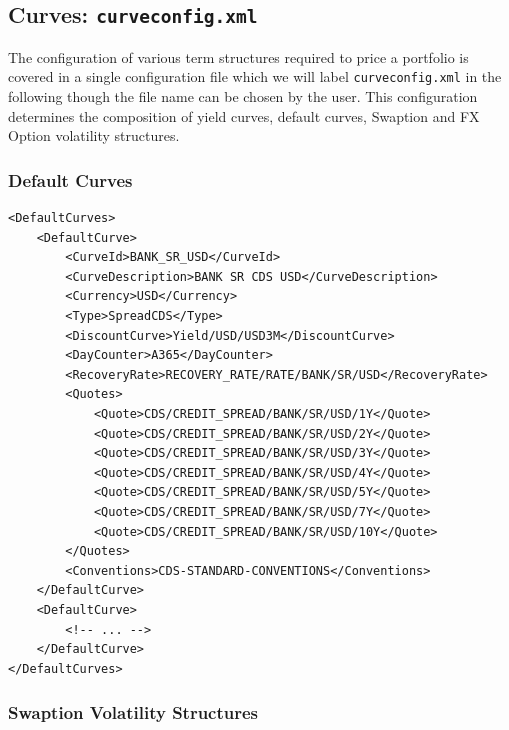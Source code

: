 \documentclass[12pt, a4paper]{article}
\begin{document}
\subsection{Curves: {\tt curveconfig.xml}}

The configuration of various term structures required to price a portfolio is covered in a single configuration file which we will label {\tt curveconfig.xml} in the following though the file name can be chosen by the user. This configuration determines the composition of yield curves, default curves, Swaption and FX Option volatility structures.
 


\subsubsection{Default Curves}

\begin{lstlisting}[caption={Default curve configuration}, 	label=lst:defaultcurve_configuration]
<DefaultCurves>
	<DefaultCurve>
		<CurveId>BANK_SR_USD</CurveId>
		<CurveDescription>BANK SR CDS USD</CurveDescription>
		<Currency>USD</Currency>
		<Type>SpreadCDS</Type>
		<DiscountCurve>Yield/USD/USD3M</DiscountCurve>
		<DayCounter>A365</DayCounter>
		<RecoveryRate>RECOVERY_RATE/RATE/BANK/SR/USD</RecoveryRate>
		<Quotes>
			<Quote>CDS/CREDIT_SPREAD/BANK/SR/USD/1Y</Quote>
			<Quote>CDS/CREDIT_SPREAD/BANK/SR/USD/2Y</Quote>
			<Quote>CDS/CREDIT_SPREAD/BANK/SR/USD/3Y</Quote>
			<Quote>CDS/CREDIT_SPREAD/BANK/SR/USD/4Y</Quote>
			<Quote>CDS/CREDIT_SPREAD/BANK/SR/USD/5Y</Quote>
			<Quote>CDS/CREDIT_SPREAD/BANK/SR/USD/7Y</Quote>
			<Quote>CDS/CREDIT_SPREAD/BANK/SR/USD/10Y</Quote>
		</Quotes>
		<Conventions>CDS-STANDARD-CONVENTIONS</Conventions>
	</DefaultCurve>
	<DefaultCurve>
		<!-- ... -->
	</DefaultCurve>
</DefaultCurves>

\end{lstlisting}

\subsubsection{Swaption Volatility Structures}
\end{document}
